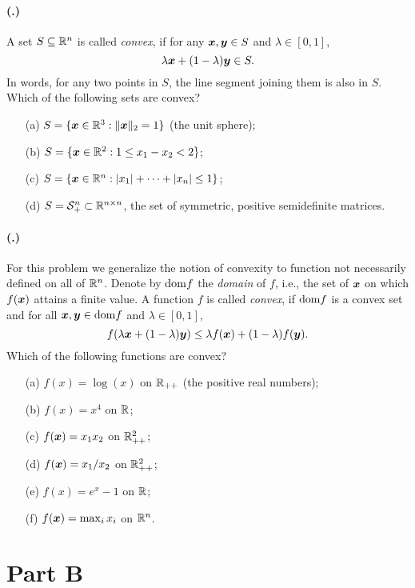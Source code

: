 \documentclass{article}
\newcounter{problemSheetNumber}
\newcounter{problems}
\renewcommand{\problem}{\paragraph{(\theproblemSheetNumber.\theproblems)}\addtocounter{problems}{1}}
\begin{document}
\problem A set $S\subseteq \mathbb{R}^n$ is called {\em convex}, if for any $\bm{x},\bm{y}\in S$ and $\lambda\in [0,1]$, 
\begin{equation*}
 \lambda \bm{x}+(1-\lambda)\bm{y}\in S.
\end{equation*}
In words, for any two points in $S$, the line segment joining them is also in $S$. Which of the following sets are convex?
\begin{itemize}
 \item[(a)] $S = \{\bm{x}\in \mathbb{R}^3 \mathrel{\mathop{:}} \Vert {\bm{x}}\Vert_2=1\}$ (the unit sphere);
 \item[(b)] $S = \{\bm{x}\in \mathbb{R}^2 \mathrel{\mathop{:}} 1\leq x_1-x_2< 2\}$;
 \item[(c)] $S = \{\bm{x}\in \mathbb{R}^n \mathrel{\mathop{:}} |x_1|+\cdots+|x_n|\leq 1\}$;
 \item[(d)] $S = \mathcal{S}^n_{+}\subset \mathbb{R}^{n\times n}$, the set of symmetric, positive semidefinite matrices.
\end{itemize}

\problem For this problem we generalize the notion of convexity to function not necessarily defined on all of $\mathbb{R}^n$. Denote by $\mathrm{dom} f$ the {\em domain} of $f$, i.e., the set of $\bm{x}$ on which $f(\bm{x})$ attains a finite value. A function $f$ is called {\em convex}, if $\mathrm{dom} f$ is a convex set and for all $\bm{x},\bm{y}\in \mathrm{dom} f$ and $\lambda\in [0,1]$,
\begin{equation*}
 f(\lambda \bm{x}+(1-\lambda)\bm{y})\leq \lambda f(\bm{x})+(1-\lambda)f(\bm{y}).
\end{equation*}
Which of the following functions are convex?
\begin{itemize}
 \item[(a)] $f(x) = \log(x)$ on $\mathbb{R}_{++}$ (the positive real numbers);
 \item[(b)] $f(x) = x^4$ on $\mathbb{R}$;
 \item[(c)] $f(\bm{x}) = x_1x_2$ on $\mathbb{R}^2_{++}$;
 \item[(d)] $f(\bm{x}) = x_1/x_2$ on $\mathbb{R}^2_{++}$;
 \item[(e)] $f(x)=e^x-1$ on $\mathbb{R}$;
 \item[(f)] $f(\bm{x}) = \max_i x_i$ on $\mathbb{R}^n$.
\end{itemize}

\section*{Part B}
\end{document}
